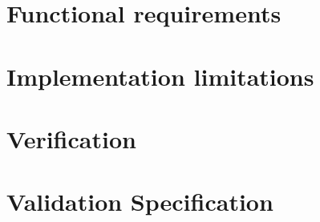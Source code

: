 \documentclass[../../main.tex]{subfiles}
\begin{document}
\section{Functional requirements}%
\label{sec:function_requirements}


\section{Implementation limitations}%
\label{sec:implementation_limitations}


\section{Verification}%
\label{sec:verification}


\section{Validation Specification}%
\label{sec:validation_specification}


	
\end{document}
